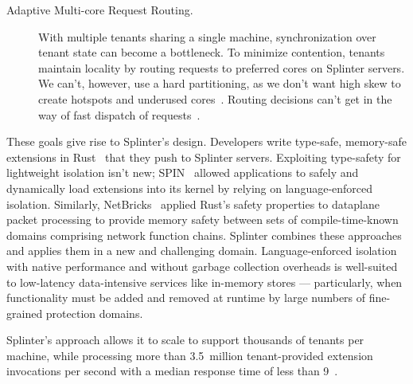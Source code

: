 \begin{description}
\item[Adaptive Multi-core Request Routing.]
  With multiple tenants sharing a single machine, synchronization over tenant
    state can become a bottleneck.
  To minimize contention, tenants maintain locality by routing requests to
    preferred cores on Splinter servers.
  We can't, however, use a hard partitioning, as we don't want high skew to
    create hotspots and underused cores~\cite{zygos}.
    Routing decisions can't get in the way of fast dispatch of requests~\cite{ix}.

\end{description}

These goals give rise to Splinter's design.
Developers write type-safe, memory-safe extensions in Rust~\cite{rust}
that they push to Splinter servers.
Exploiting type-safety for lightweight isolation isn't new;
SPIN~\cite{spin} allowed applications to safely and dynamically load
extensions into its kernel by relying on language-enforced isolation.
Similarly, NetBricks~\cite{netbricks-2016} applied Rust's safety
properties to dataplane packet processing to
  provide memory safety between sets of compile-time-known domains comprising
  network function chains.
Splinter combines these approaches and applies them in a new and challenging domain.
Language-enforced isolation with native performance and without garbage
  collection overheads is well-suited to low-latency data-intensive services
  like in-memory stores --- particularly, when functionality must be added and removed at
  runtime by large numbers of fine-grained protection domains.

Splinter's approach allows it to scale to support thousands of tenants per
  machine, while processing more than
  3.5~million tenant-provided extension invocations per second with a median
  response time of less than 9~\us.

